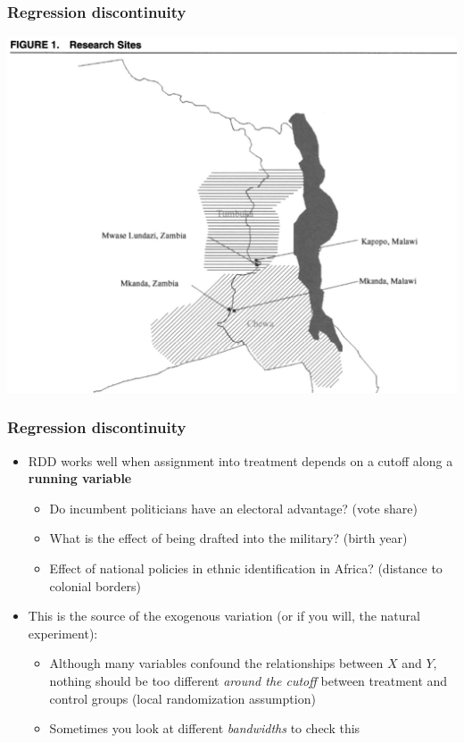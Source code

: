 \documentclass[aspectratio=43]{beamer}
\begin{document}
\begin{frame}
\frametitle{Regression discontinuity}
\centering

\includegraphics[width = \textwidth]{../img/posner2}

\end{frame}


\begin{frame}
\frametitle{Regression discontinuity}
\centering

\begin{itemize}
  \item RDD works well when assignment into treatment depends on a cutoff along a \textbf{running variable}
  \begin{itemize}
    \item Do incumbent politicians have an electoral advantage? (vote share)
    \item What is the effect of being drafted into the military? (birth year)
    \item Effect of national policies in ethnic identification in Africa? (distance to colonial borders)
  \end{itemize}
  \item This is the source of the exogenous variation (or if you will, the natural experiment):
  \begin{itemize}
    \item Although many variables confound the relationships between $X$ and $Y$, nothing should be too different \textit{around the cutoff} between treatment and control groups (local randomization assumption)
    \item Sometimes you look at different \textit{bandwidths} to check this
  \end{itemize}
\end{itemize}

\end{frame}
\end{document}
